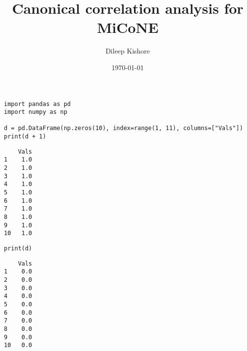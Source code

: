 \documentclass[11pt]{article}
\author{Dileep Kishore}
\date{\today}
\title{Canonical correlation analysis for MiCoNE}
\begin{document}
\maketitle
\tableofcontents

\begin{verbatim}
import pandas as pd
import numpy as np

d = pd.DataFrame(np.zeros(10), index=range(1, 11), columns=["Vals"])
print(d + 1)
\end{verbatim}

\begin{verbatim}
    Vals
1    1.0
2    1.0
3    1.0
4    1.0
5    1.0
6    1.0
7    1.0
8    1.0
9    1.0
10   1.0
\end{verbatim}

\begin{verbatim}
print(d)
\end{verbatim}

\begin{verbatim}
    Vals
1    0.0
2    0.0
3    0.0
4    0.0
5    0.0
6    0.0
7    0.0
8    0.0
9    0.0
10   0.0
\end{verbatim}
\end{document}
